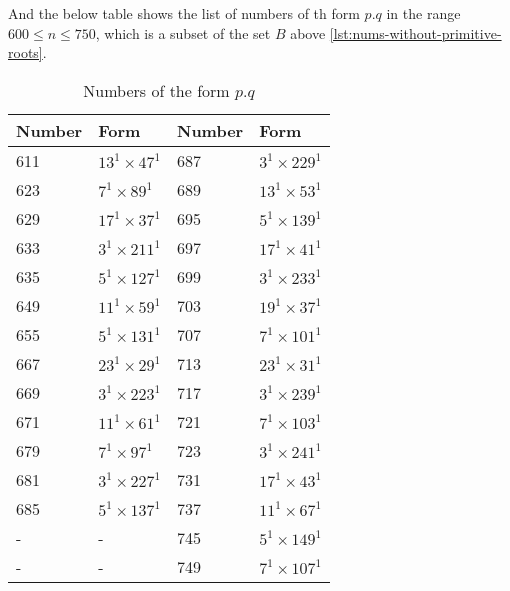 \documentclass[11pt,a4paper,fleqn]{article}
\begin{document}
\begin{enumerate}[1.]
\begin{enumerate}[(a)]
\begin{flushleft}
				\medbreak
				And the below table shows the list of numbers of th form $p.q$ in the range $600 \le n \le 750$, which is a subset of the set $B$ above \ref{lst:nums-without-primitive-roots}.
				\begin{table}[H]
					\centering
					\begin{tabular}{|l|l|l|l|}
						\hline
						Number & Form & Number & Form\\ \hline
						611 & $13^1\times47^1$ & 687 & $3^1\times229^1$ \\ \hline
						623 & $7^1\times89^1$ & 689 & $13^1\times53^1$ \\ \hline
						629 & $17^1\times37^1$ & 695 & $5^1\times139^1$ \\ \hline
						633 & $3^1\times211^1$ & 697 & $17^1\times41^1$ \\ \hline
						635 & $5^1\times127^1$ & 699 & $3^1\times233^1$ \\ \hline
						649 & $11^1\times59^1$ & 703 & $19^1\times37^1$ \\ \hline
						655 & $5^1\times131^1$ & 707 & $7^1\times101^1$ \\ \hline
						667 & $23^1\times29^1$ & 713 & $23^1\times31^1$ \\ \hline
						669 & $3^1\times223^1$ & 717 & $3^1\times239^1$ \\ \hline
						671 & $11^1\times61^1$ & 721 & $7^1\times103^1$ \\ \hline
						679 & $7^1\times97^1$ & 723 & $3^1\times241^1$ \\ \hline
						681 & $3^1\times227^1$ & 731 & $17^1\times43^1$ \\ \hline
						685 & $5^1\times137^1$ & 737 & $11^1\times67^1$ \\ \hline
						-   & -                & 745 & $5^1\times149^1$ \\ \hline
						-   & -                & 749 & $7^1\times107^1$ \\ \hline
					\end{tabular}
					\caption{Numbers of the form $p.q$}
					\label{table:number-p.q-without-primitive-roots}
				\end{table}
			\end{flushleft}


\end{enumerate}
\end{enumerate}
\end{document}
